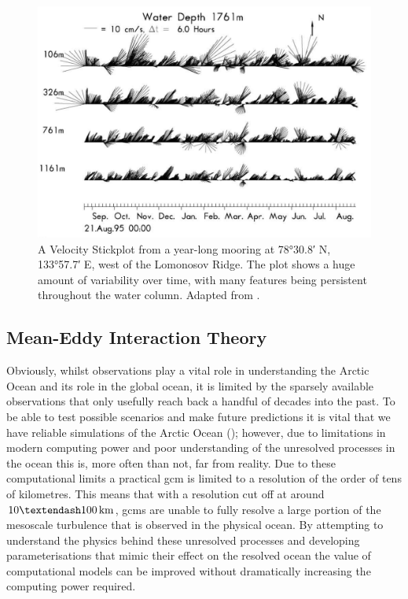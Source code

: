 \documentclass[10pt,a4paper]{article}
\begin{document}
\begin{figure}
	\centering
	\includegraphics[width=\linewidth]{Woodgate2001Mooring}
	\caption[Adapted from \cite{woodgate2001arctic}]{A Velocity Stickplot 
		from a year-long mooring at \ang{78;30.8;} N, \ang{133;57.7;} E, west of the Lomonosov Ridge.  The plot shows a huge amount of variability over time, with many
		features being persistent throughout the water column. Adapted from \cite{woodgate2001arctic}.}
	\label{fig:Woodgate2001Mooring}
\end{figure}

\subsection{Mean-Eddy Interaction Theory}

\label{meaneddyinteractiontheory}

 Obviously, whilst observations play a vital role in understanding the Arctic
 Ocean and its role in the global ocean, it is limited by the sparsely available
 observations that only usefully reach back a handful of decades into the past.
 To be able to test possible scenarios and make future predictions it is vital
 that we have reliable simulations of the Arctic Ocean (\cite{proshutinsky2008toward});
 however, due to limitations
 in modern computing power and poor understanding of the unresolved processes 
 in the ocean this is, more often than not, far from reality.
 Due to these computational limits a practical \gls{gcm} is 
 limited to a  resolution of the order of tens of kilometres. This means that with a 
 resolution  cut off at around $10 \textendash 100 \, \mathrm{km}$, 
 \glspl{gcm} are unable to fully resolve a large portion of the mesoscale turbulence that is
 observed in the physical ocean.
 By attempting  to understand the physics behind these unresolved processes 
 and developing parameterisations that mimic their effect on the resolved ocean
 the value of computational models can be improved without dramatically increasing the
 computing power required.  
 
\end{document}
